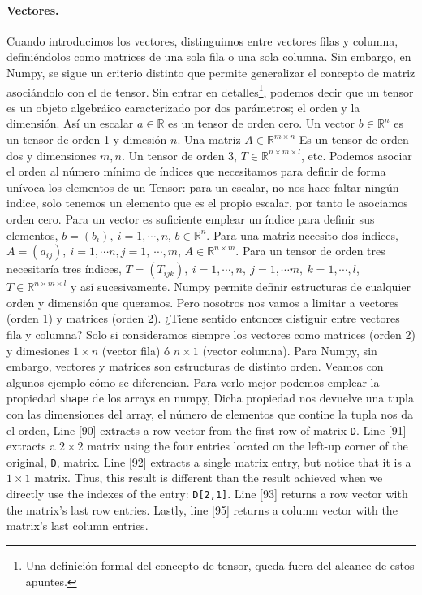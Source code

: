 \begin{paracol}{2}
\paragraph{Vectores.}
Cuando introducimos los vectores, distinguimos entre vectores filas y columna, definiéndolos como matrices de una sola fila o una sola columna. Sin embargo, en Numpy, se sigue un criterio distinto que permite generalizar el concepto de matriz asociándolo con el de tensor. Sin entrar en detalles\footnote{Una definición formal del concepto de tensor, queda fuera del alcance de estos apuntes.}, podemos decir que un tensor es un objeto algebráico caracterizado por dos parámetros; el orden y la dimensión. Así un escalar $a \in \mathbb{R}$ es un tensor de orden cero. Un vector $b \in \mathbb{R}^n$ es un tensor de orden 1 y dimesión $n$. Una matriz $A \in \mathbb{R}^{m\times n}$ Es un tensor de orden dos y dimensiones $m,n$. Un tensor de orden 3, $T \in \mathbb{R}^{n\times m \times l}$, etc. Podemos asociar el orden al número mínimo de índices que necesitamos para definir de forma unívoca los elementos de un Tensor: para un escalar, no nos hace faltar ningún indice, solo tenemos un elemento que es el propio escalar, por tanto le asociamos orden cero. Para un vector es suficiente emplear un índice para definir sus elementos, $b=(b_i),\ i=1,\cdots, n$, $b \in \mathbb{R}^n$. Para una matriz necesito dos índices, $A=(a_{ij}),\ i =1, \cdots n, j = 1,\ \cdots, m$, $A \in \mathbb{R}^{n\times m}$. Para un tensor de orden tres necesitaría tres índices, $T=(T_{ijk}),\ i =1,\cdots, n,\ j =1,\cdots m,\ k = 1,\cdots, l$, $T\in \mathbb{R}^{n\times m \times l}$ y así sucesivamente. Numpy permite definir estructuras de cualquier orden y dimensión que queramos. Pero nosotros nos vamos a limitar a vectores (orden 1) y matrices (orden 2). ¿Tiene sentido entonces distiguir entre vectores fila y columna? Solo si consideramos siempre los vectores como matrices (orden 2) y dimesiones $1\times n$ (vector fila) ó $n \times 1$ (vector columna). Para Numpy, sin embargo, vectores y matrices son estructuras de distinto orden. Veamos con algunos ejemplo cómo se diferencian. Para verlo mejor podemos emplear la propiedad \texttt{shape} de los arrays en numpy, Dicha propiedad nos devuelve una tupla con las dimensiones del array, el número de elementos que contine la tupla nos da el orden,
\switchcolumn
Line [90] extracts a row vector from the first row of matrix \texttt{D}. Line [91] extracts a $2\times 2$ matrix using the four entries located on the left-up corner of the original, \texttt{D}, matrix. Line [92] extracts a single matrix entry, but notice that it is a $1\times 1$ matrix. Thus, this result is different than the result achieved when we directly use the indexes of the entry: \texttt{D[2,1]}. Line [93] returns a row vector with the matrix's last row entries. Lastly, line [95] returns a column vector with the matrix's last column entries.


\end{paracol}
